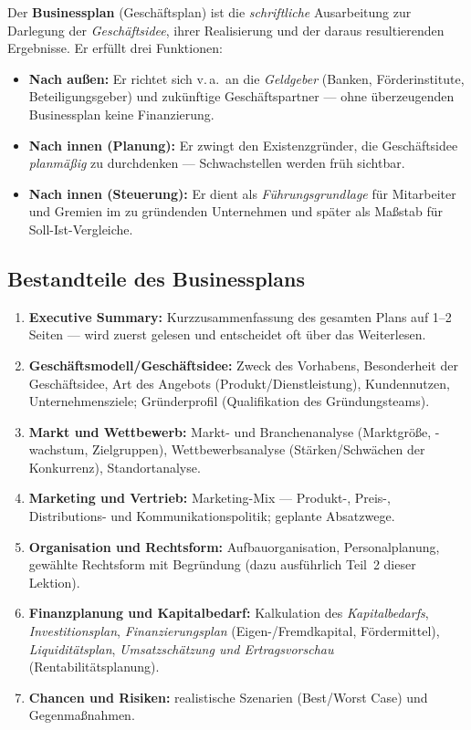\documentclass[11pt, a4paper]{article}
\begin{document}
Der \textbf{Businessplan} (Geschäftsplan) ist die \emph{schriftliche} Ausarbeitung zur
Darlegung der \emph{Geschäftsidee}, ihrer Realisierung und der daraus resultierenden
Ergebnisse. Er erfüllt drei Funktionen:

\begin{itemize}
  \item \textbf{Nach außen:} Er richtet sich v.\,a.\ an die \emph{Geldgeber} (Banken,
    Förderinstitute, Beteiligungsgeber) und zukünftige Geschäftspartner --- ohne
    überzeugenden Businessplan keine Finanzierung.
  \item \textbf{Nach innen (Planung):} Er zwingt den Existenzgründer, die Geschäftsidee
    \emph{planmäßig} zu durchdenken --- Schwachstellen werden früh sichtbar.
  \item \textbf{Nach innen (Steuerung):} Er dient als \emph{Führungsgrundlage} für
    Mitarbeiter und Gremien im zu gründenden Unternehmen und später als Maßstab für
    Soll-Ist-Vergleiche.
\end{itemize}

\subsection{Bestandteile des Businessplans}

\begin{enumerate}
  \item \textbf{Executive Summary:} Kurzzusammenfassung des gesamten Plans auf 1--2
    Seiten --- wird zuerst gelesen und entscheidet oft über das Weiterlesen.
  \item \textbf{Geschäftsmodell/Geschäftsidee:} Zweck des Vorhabens, Besonderheit der
    Geschäftsidee, Art des Angebots (Produkt/Dienstleistung), Kundennutzen,
    Unternehmensziele; Gründerprofil (Qualifikation des Gründungsteams).
  \item \textbf{Markt und Wettbewerb:} Markt- und Branchenanalyse (Marktgröße, -wachstum,
    Zielgruppen), Wettbewerbsanalyse (Stärken/Schwächen der Konkurrenz), Standortanalyse.
  \item \textbf{Marketing und Vertrieb:} Marketing-Mix --- Produkt-, Preis-,
    Distributions- und Kommunikationspolitik; geplante Absatzwege.
  \item \textbf{Organisation und Rechtsform:} Aufbauorganisation, Personalplanung,
    gewählte Rechtsform mit Begründung (dazu ausführlich Teil~2 dieser Lektion).
  \item \textbf{Finanzplanung und Kapitalbedarf:} Kalkulation des \emph{Kapitalbedarfs},
    \emph{Investitionsplan}, \emph{Finanzierungsplan} (Eigen-/Fremdkapital, Fördermittel),
    \emph{Liquiditätsplan}, \emph{Umsatzschätzung und Ertragsvorschau}
    (Rentabilitätsplanung).
  \item \textbf{Chancen und Risiken:} realistische Szenarien (Best/Worst Case) und
    Gegenmaßnahmen.
\end{enumerate}
\end{document}
